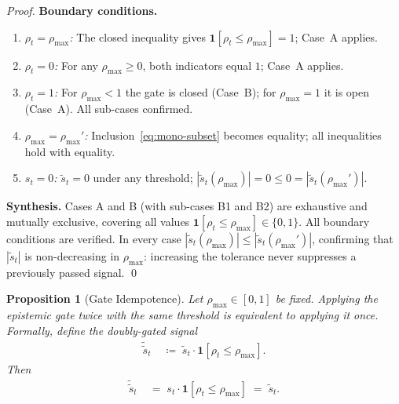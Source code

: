 \documentclass[12pt,openany]{book}
\numberwithin{equation}{chapter}
\theoremstyle{plain}
\newtheorem{proposition}[theorem]{Proposition}
\theoremstyle{definition}
\theoremstyle{remark}
\numberwithin{equation}{chapter}
\theoremstyle{plain}
\begin{document}
\begin{proof}
\medskip
\noindent\textbf{Boundary conditions.}
\begin{enumerate}
  \item \emph{$\rho_t = \rho_{\max}$:}
        The closed inequality gives
        $\mathbf{1}[\rho_t \leq \rho_{\max}] = 1$; Case~A applies.
  \item \emph{$\rho_t = 0$:}
        For any $\rho_{\max} \geq 0$, both indicators equal $1$;
        Case~A applies.
  \item \emph{$\rho_t = 1$:}
        For $\rho_{\max} < 1$ the gate is closed (Case~B);
        for $\rho_{\max} = 1$ it is open (Case~A).
        All sub-cases confirmed.
  \item \emph{$\rho_{\max} = \rho_{\max}'$:}
        Inclusion~\eqref{eq:mono-subset} becomes equality;
        all inequalities hold with equality.
  \item \emph{$s_t = 0$:}
        $\tilde{s}_t = 0$ under any threshold;
        $|\tilde{s}_t(\rho_{\max})| = 0 \leq 0 =
        |\tilde{s}_t(\rho_{\max}')|$.
\end{enumerate}

\medskip
\noindent\textbf{Synthesis.}
Cases A and B (with sub-cases B1 and B2) are exhaustive and
mutually exclusive, covering all values
$\mathbf{1}[\rho_t \leq \rho_{\max}] \in \{0,1\}$.
All boundary conditions are verified.  In every case
$|\tilde{s}_t(\rho_{\max})| \leq |\tilde{s}_t(\rho_{\max}')|$,
confirming that $|\tilde{s}_t|$ is non-decreasing in $\rho_{\max}$:
increasing the tolerance never suppresses a previously passed signal.
\qed
\end{proof}

\begin{proposition}[Gate Idempotence]
\label{prop:gate-idem}
Let $\rho_{\max} \in [0,1]$ be fixed.
Applying the epistemic gate twice with the same threshold is
equivalent to applying it once.
Formally, define the doubly-gated signal
\begin{align}
  \tilde{\tilde{s}}_t
  &\;\coloneqq\;
  \tilde{s}_t \cdot \mathbf{1}[\rho_t \leq \rho_{\max}].
  \label{eq:double-gate-def}
\end{align}
Then
\begin{align}
  \tilde{\tilde{s}}_t
  &\;=\; s_t \cdot \mathbf{1}[\rho_t \leq \rho_{\max}]
  \;=\; \tilde{s}_t.
  \label{eq:gate-idem}
\end{align}
\end{proposition}
\end{document}
